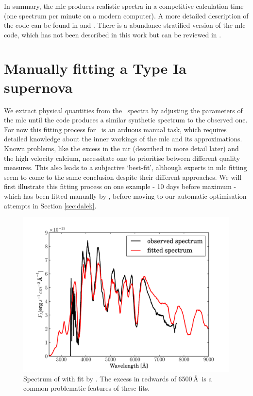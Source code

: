 In summary, the \gls{mlc} produces realistic spectra in a competitive calculation time (one spectrum per minute on a modern computer). A more detailed description of the code can be found in  \citet{1993A&A...279..447M} and \citet{2000A&A...363..705M}. There is a abundance stratified version of the \gls{mlc} code, which has not been described in this work but can be reviewed in \citet{2005MNRAS.360.1231S}.


\section{Manually fitting a Type Ia supernova}
\label{sec:manual_sneia}

We extract physical quantities from the \snia\ spectra by adjusting the parameters of the \gls{mlc} until the code produces a similar synthetic spectrum to the observed one. For now this fitting process for \sneia\ is an arduous manual task, which requires detailed knowledge about the inner workings of the \gls{mlc} and its approximations. Known problems, like the excess in the \gls{nir} (described in more detail later) and the high velocity calcium, necessitate one to prioritise between different quality measures. This also leads to a subjective `best-fit', although experts in \gls{mlc} fitting seem to come to the same conclusion despite their different approaches. We will first illustrate this fitting process on one example -  10 days before maximum \citep{2004MNRAS.348..261B} - which has been fitted manually by \citet[][]{hachinger_dipl2007}, before moving to our automatic optimisation attempts in Section \ref{sec:dalek}. 
\begin{figure}[htbp] %
   \centering
   \includegraphics[width=\textwidth, trim=0 0 1cm 0, clip]{chapter_dalek/plots/bf2002bo-10.pdf} 
   \caption[Spectrum on SN 2002bo with MLMC fit]{Spectrum of  \citep{2004MNRAS.348..261B} with  fit by \citet{hachinger_dipl2007}. The excess in redwards of 6500\,\AA\ is a common problematic features of these fits.}
   \label{fig:sn2002bo-10_bf}
\end{figure}

